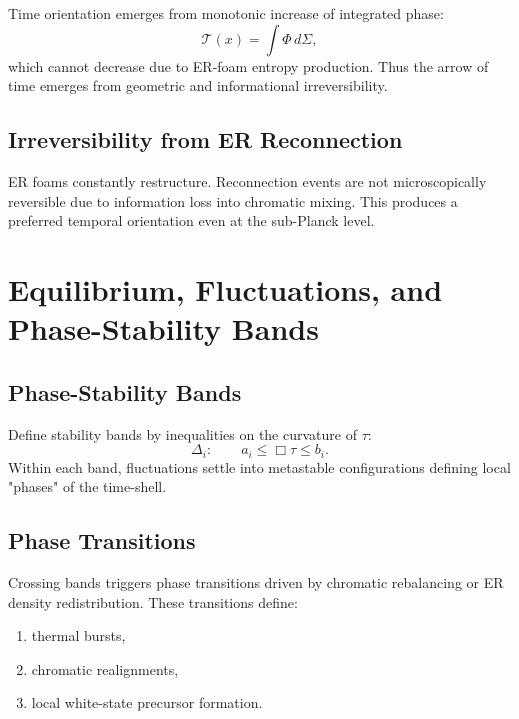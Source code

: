 Time orientation emerges from monotonic increase of integrated phase:
\[
\mathcal{T}(x) = \int \Phi\, d\Sigma,
\]
which cannot decrease due to ER-foam entropy production.
Thus the arrow of time emerges from geometric and informational irreversibility.

\section{Irreversibility from ER Reconnection}

ER foams constantly restructure.
Reconnection events are not microscopically reversible due to information loss into chromatic mixing.
This produces a preferred temporal orientation even at the sub-Planck level.


\chapter{Equilibrium, Fluctuations, and Phase-Stability Bands}

\section{Phase-Stability Bands}

Define stability bands by inequalities on the curvature of $\tau$:
\[
\Delta_i: \qquad a_i \le \Box \tau \le b_i.
\]
Within each band, fluctuations settle into metastable configurations defining local "phases" of the time-shell.

\section{Phase Transitions}

Crossing bands triggers phase transitions driven by chromatic rebalancing or ER density redistribution.
These transitions define:
\begin{enumerate}
\item thermal bursts,
\item chromatic realignments,
\item local white-state precursor formation.
\end{enumerate}

